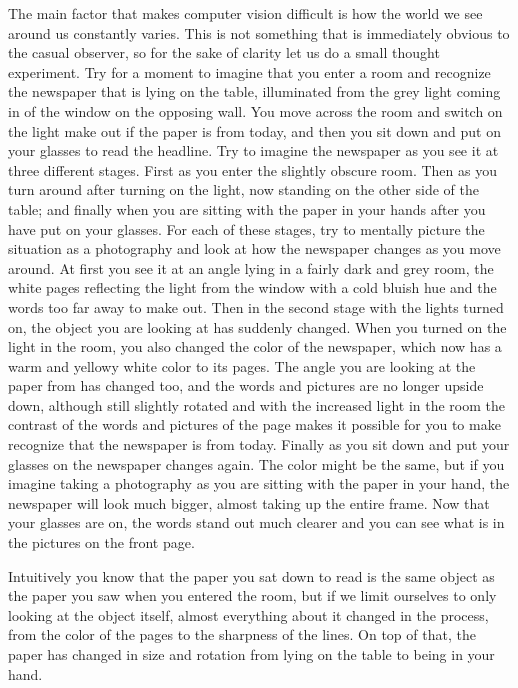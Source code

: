 The main factor that makes computer vision difficult is how the world we 
see around us constantly varies. This is not something that is 
immediately obvious to the casual observer, so for the sake of clarity 
let us do a small thought experiment. Try for a moment to imagine that 
you enter a room and recognize the newspaper that is lying on the table, 
illuminated from the grey light coming in of the window on the opposing 
wall. You move across the room and switch on the light make out if the 
paper is from today, and then you sit down and put on your glasses to 
read the headline. Try to imagine the newspaper as you see it at three 
different stages. First as you enter the slightly obscure room. Then as 
you turn around after turning on the light, now standing on the other 
side of the table; and finally when you are sitting with the paper in 
your hands after you have put on your glasses. For each of these stages, 
try to mentally picture the situation as a photography and look at how 
the newspaper changes as you move around. At first you see it at an 
angle lying in a fairly dark and grey room, the white pages reflecting 
the light from the window with a cold bluish hue and the words too far 
away to make out.  Then in the second stage with the lights turned on, 
the object you are looking at has suddenly changed.  When you turned on 
the light in the room, you also changed the color of the newspaper, 
which now has a warm and yellowy white color to its pages.  The angle 
you are looking at the paper from has changed too, and the words and 
pictures are no longer upside down, although still slightly rotated and 
with the increased light in the room the contrast of the words and 
pictures of the page makes it possible for you to make recognize that 
the newspaper is from today.  Finally as you sit down and put your 
glasses on the newspaper changes again. The color might be the same, but 
if you imagine taking a photography as you are sitting with the paper in 
your hand, the newspaper will look much bigger, almost taking up the 
entire frame. Now that your glasses are on, the words stand out much 
clearer and you can see what is in the pictures on the front page.

Intuitively you know that the paper you sat down to read is the same 
object as the paper you saw when you entered the room, but if we limit 
ourselves to only looking at the object itself, almost everything about 
it changed in the process, from the color of the pages to the sharpness 
of the lines. On top of that, the paper has changed in size and rotation 
from lying on the table to being in your hand.  


